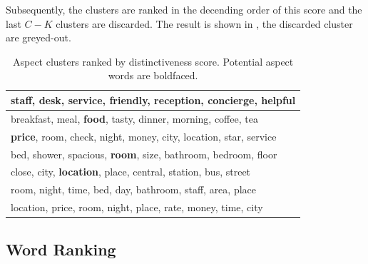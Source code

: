 Subsequently, the clusters are ranked in the decending order of 
this score and the last $C-K$ clusters are discarded.
The result is shown in , the discarded cluster are greyed-out.

\begin{table}[t]
\caption{Aspect clusters ranked by distinctiveness score.
Potential aspect words are boldfaced.}
\label{table:clustersranked}
\centering
\begin{tabular}{|l|} \hline
\textbf{staff}, desk, \textbf{service}, friendly, reception, concierge, helpful \\\hline
breakfast, meal, \textbf{food}, tasty, dinner, morning, coffee, tea \\\hline
\textbf{price}, room, check, night, money, city, location, star, service \\\hline
bed, shower, spacious, \textbf{room}, size, bathroom, bedroom, floor \\\hline
close, city, \textbf{location}, place, central, station, bus, street \\\hline
\textcolor{mygray}{room, night, time, bed, day, bathroom, staff, area, place} \\\hline
\textcolor{mygray}{location, price, room, night, place, rate, money, time, city} \\\hline
\end{tabular}
\end{table}

\subsection{Word Ranking}
\label{sec:word_ranking}



